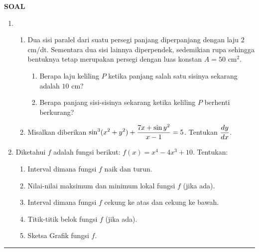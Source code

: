 \begin{center}
\textbf{\large{SOAL}}
\end{center}
\begin{enumerate}[leftmargin=*, label={\arabic*}.]
\item 
    \begin{enumerate}[label={\alph*}.]
    \item Dua sisi paralel dari suatu persegi panjang diperpanjang dengan laju 
    $2$ cm/dt. Sementara dua sisi lainnya diperpendek, sedemikian rupa sehingga 
    bentuknya tetap merupakan persegi dengan luas konstan $A=50$ cm$^2$.
        \begin{enumerate}[label={\roman*}.]
        \item Berapa laju keliling $P$ ketika panjang salah satu sisinya sekarang 
        adalah $10$ cm?
        \item Berapa panjang sisi-sisinya sekarang ketika keliling $P$ berhenti 
        berkurang?
        \end{enumerate}
    \item Misalkan diberikan $\displaystyle\sin^{3}(x^2+y^2)+\frac{7x+\sin y^{2}}{x-1}=5$.
    Tentukan $\displaystyle\frac{dy}{dx}$.
    \end{enumerate}
\item Diketahui $f$ adalah fungsi berikut: $f(x)=x^{4}-4x^{3}+10$. Tentukan:
    \begin{enumerate}[label={\alph*}.]
    \item Interval dimana fungsi $f$ naik dan turun.
    \item Nilai-nilai maksimum dan minimum lokal fungsi $f$ (jika ada).
    \item Interval dimana fungsi $f$ cekung ke atas dan cekung ke bawah.
    \item Titik-titik belok fungsi $f$ (jika ada).
    \item Sketsa Grafik fungsi $f$.
    \end{enumerate}
\end{enumerate}


\vspace{0.2cm}\hrule height 1pt\vspace{0.5cm}


